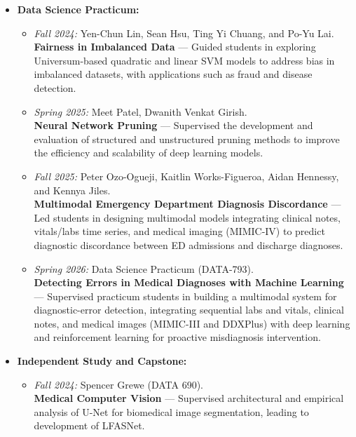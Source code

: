 \documentclass[letterpaper,11pt]{article}
\newcommand{\resheading}[1]{\par\vspace{0.6em}\noindent{\large\textbf{#1}}\par\vspace{0.25em}}
\begin{document}
\resheading{\LARGE{Supervising Experience}}
\begin{itemize}
    \item \textbf{Data Science Practicum:}
        \begin{itemize}
            \item \textit{Fall 2024:} Yen-Chun Lin, Sean Hsu, Ting Yi Chuang, and Po-Yu Lai. \\
                \textbf{Fairness in Imbalanced Data} --- Guided students in exploring Universum-based quadratic and linear SVM models to address bias in imbalanced datasets, with applications such as fraud and disease detection.

            \item \textit{Spring 2025:} Meet Patel, Dwanith Venkat Girish. \\
                \textbf{Neural Network Pruning} --- Supervised the development and evaluation of structured and unstructured pruning methods to improve the efficiency and scalability of deep learning models.

            \item \textit{Fall 2025:} Peter Ozo-Ogueji, Kaitlin Works-Figueroa, Aidan Hennessy, and Kennya Jiles. \\
                \textbf{Multimodal Emergency Department Diagnosis Discordance} --- Led students in designing multimodal models integrating clinical notes, vitals/labs time series, and medical imaging (MIMIC-IV) to predict diagnostic discordance between ED admissions and discharge diagnoses.

            \item \textit{Spring 2026:} Data Science Practicum (DATA-793). \\
                \textbf{Detecting Errors in Medical Diagnoses with Machine Learning} --- Supervised practicum students in building a multimodal system for diagnostic-error detection, integrating sequential labs and vitals, clinical notes, and medical images (MIMIC-III and DDXPlus) with deep learning and reinforcement learning for proactive misdiagnosis intervention.
        \end{itemize}

    \item \textbf{Independent Study and Capstone:}
        \begin{itemize}
            \item \textit{Fall 2024:} Spencer Grewe (DATA 690). \\
                \textbf{Medical Computer Vision} --- Supervised architectural and empirical analysis of U-Net for biomedical image segmentation, leading to development of LFASNet.
        \end{itemize}


\end{itemize}
\end{document}
